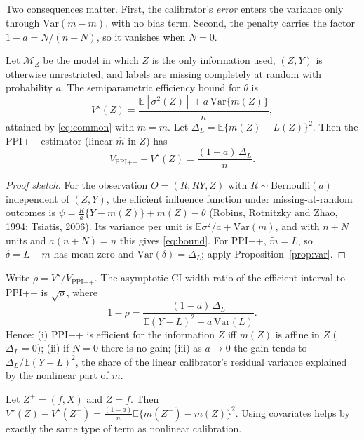 Two consequences matter. First, the calibrator's \emph{error} enters the variance only through $\mathrm{Var}(\tilde m-m)$, with no bias term. Second, the penalty carries the factor $1-a=N/(n+N)$, so it vanishes when $N=0$.

\begin{theorem}
\label{thm:bound}
Let $\mathcal M_Z$ be the model in which $Z$ is the only information used, $(Z,Y)$ is otherwise unrestricted, and labels are missing completely at random with probability $a$. The semiparametric efficiency bound for $\theta$ is
\begin{equation}
V^\star(Z)=\frac{\mathbb E[\sigma^2(Z)]+a\,\mathrm{Var}\{m(Z)\}}{n},
\label{eq:bound}
\end{equation}
attained by \eqref{eq:common} with $\tilde m=m$. Let $\Delta_L=\mathbb E\{m(Z)-L(Z)\}^2$. Then the PPI++ estimator (linear $\hat m$ in $Z$) has
\begin{equation}
V_{\mathrm{PPI}\text{++}}-V^\star(Z)=\frac{(1-a)\,\Delta_L}{n}.
\label{eq:gap}
\end{equation}
\end{theorem}
\begin{proof}[Proof sketch]
For the observation $O=(R,RY,Z)$ with $R\sim\mathrm{Bernoulli}(a)$ independent of $(Z,Y)$, the efficient influence function under missing-at-random outcomes is $\psi=\frac{R}{a}\{Y-m(Z)\}+m(Z)-\theta$ (Robins, Rotnitzky and Zhao, 1994; Tsiatis, 2006). Its variance per unit is $\mathbb E\sigma^2/a+\mathrm{Var}(m)$, and with $n+N$ units and $a(n+N)=n$ this gives \eqref{eq:bound}. For PPI++, $\tilde m=L$, so $\delta=L-m$ has mean zero and $\mathrm{Var}(\delta)=\Delta_L$; apply Proposition~\ref{prop:var}.
\end{proof}

\begin{corollary}
\label{cor:when}
Write $\rho=V^\star/V_{\mathrm{PPI}\text{++}}$. The asymptotic CI width ratio of the efficient interval to PPI++ is $\sqrt\rho$, where
\[
1-\rho=\frac{(1-a)\,\Delta_L}{\mathbb E(Y-L)^2+a\,\mathrm{Var}(L)}.
\]
Hence: (i) PPI++ is efficient for the information $Z$ iff $m(Z)$ is affine in $Z$ ($\Delta_L=0$); (ii) if $N=0$ there is no gain; (iii) as $a\to0$ the gain tends to $\Delta_L/\mathbb E(Y-L)^2$, the share of the linear calibrator's residual variance explained by the nonlinear part of $m$.
\end{corollary}

\begin{corollary}
\label{cor:cov}
Let $Z^+=(f,X)$ and $Z=f$. Then $V^\star(Z)-V^\star(Z^+)=\frac{(1-a)}{n}\mathbb E\{m(Z^+)-m(Z)\}^2$. Using covariates helps by exactly the same type of term as nonlinear calibration.
\end{corollary}

